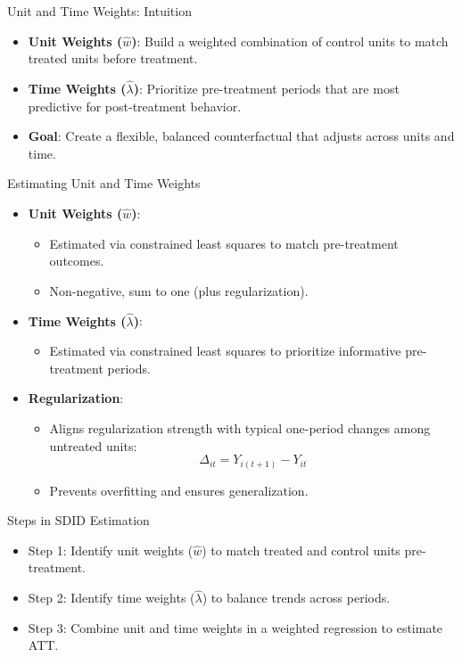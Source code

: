 \documentclass{beamer}
\begin{document}
\begin{frame}{Unit and Time Weights: Intuition}
\small
\begin{itemize}
  \item \textbf{Unit Weights (\(\hat{w}\))}: 
  Build a weighted combination of control units to match treated units before treatment.
  \item \textbf{Time Weights (\(\hat{\lambda}\))}: 
  Prioritize pre-treatment periods that are most predictive for post-treatment behavior.
  \item \textbf{Goal}: 
  Create a flexible, balanced counterfactual that adjusts across units and time.
\end{itemize}
\end{frame}



\begin{frame}{Estimating Unit and Time Weights}
\small
\begin{itemize}
  \item \textbf{Unit Weights (\(\hat{w}\))}: 
  \begin{itemize}
    \item Estimated via constrained least squares to match pre-treatment outcomes.
    \item Non-negative, sum to one (plus regularization).
  \end{itemize}
  \item \textbf{Time Weights (\(\hat{\lambda}\))}: 
  \begin{itemize}
    \item Estimated via constrained least squares to prioritize informative pre-treatment periods.
  \end{itemize}
  \item \textbf{Regularization}: 
  \begin{itemize}
    \item Aligns regularization strength with typical one-period changes among untreated units:
    \[
    \Delta_{it} = Y_{i(t+1)} - Y_{it}
    \]
    \item Prevents overfitting and ensures generalization.
  \end{itemize}
\end{itemize}
\end{frame}

\begin{frame}{Steps in SDID Estimation}
\small
\begin{itemize}
  \item Step 1: Identify unit weights (\(\hat{w}\)) to match treated and control units pre-treatment.
  \item Step 2: Identify time weights (\(\hat{\lambda}\)) to balance trends across periods.
  \item Step 3: Combine unit and time weights in a weighted regression to estimate ATT.
\end{itemize}
\end{frame}
\end{document}
